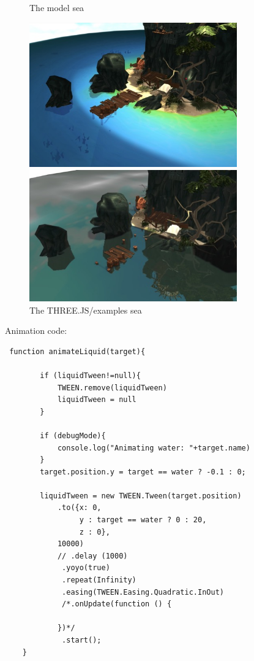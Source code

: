 \documentclass[10pt,a4paper]{article}
\begin{document}
\begin{figure}[H]
\centering
\caption{The model sea}
\includegraphics[width=0.8\textwidth]{sea}

\centering
\caption{The THREE.JS/examples sea}
\includegraphics[width=0.8\textwidth]{sea_example}
\end{figure}

\clearpage

Animation code:

\begin{verbatim}
 function animateLiquid(target){

        if (liquidTween!=null){
            TWEEN.remove(liquidTween)
            liquidTween = null
        }

        if (debugMode){
            console.log("Animating water: "+target.name)
        }
        target.position.y = target == water ? -0.1 : 0;

        liquidTween = new TWEEN.Tween(target.position)
            .to({x: 0, 
                 y : target == water ? 0 : 20, 
                 z : 0},
            10000)
            // .delay (1000)
             .yoyo(true)
             .repeat(Infinity)
             .easing(TWEEN.Easing.Quadratic.InOut)
             /*.onUpdate(function () {
               
            })*/
             .start();
    }
\end{verbatim}
\end{document}
